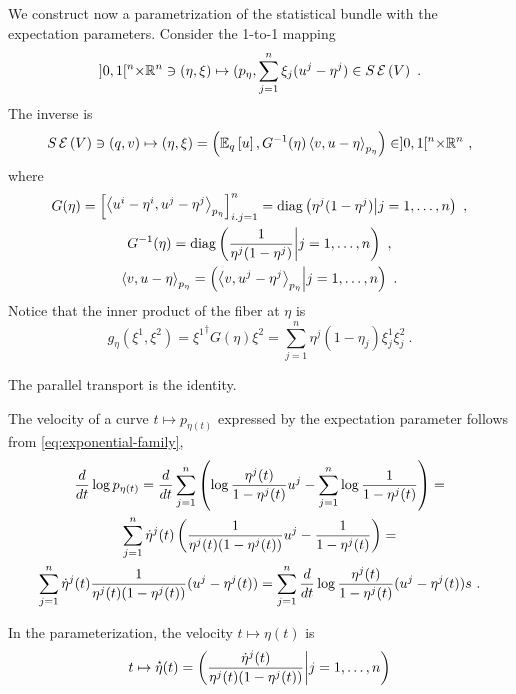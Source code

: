 \documentclass[12pt,a4paper]{amsart}
\newcommand{\transposed}{\dagger}
\theoremstyle{remark}
\begin{document}
We construct now a parametrization of the statistical bundle with the expectation parameters. Consider the 1-to-1 mapping
\begin{equation}
  \label{eq:67}
]0,1[^n \times \reals^n \ni (\eta,\xi) \mapsto (p_\eta,\sum_{j=1}^n \xi_j(u^j-\eta^j) \in \expbundleat V \ .
\end{equation}
The inverse is
\begin{equation}
  \label{eq:68}
  \expbundleat V \ni (q,v) \mapsto (\eta,\xi) = \left(\expectat q u,G^{-1}(\eta) \scalarat {p_\eta}{v}{u-\eta}\right) \in ]0,1[^n \times \reals^n \ ,
\end{equation}
where
\begin{gather}
  G(\eta) =
\begin{bmatrix}
  \scalarat {p_{\eta}} {u^i-\eta^i}{u^j-\eta^j}
\end{bmatrix}_{i.j=1}^n = \diagof{\eta^j(1-\eta^j) \middle| j = 1,\dots, n} \ , \\
G^{-1}(\eta)  = \diagof{\frac1{\eta^j(1-\eta^j)} \middle| j = 1,\dots, n} \ , \\
\scalarat {p_\eta}{v}{u-\eta} = \left(\scalarat {p_\eta}{v}{u^j-\eta^j} \middle| j=1,\dots,n \right) \ .
\end{gather}
Notice that the inner product of the fiber at $\eta$ is
\begin{equation}
  \label{eq:69}
  g_\eta(\xi^1,\xi^2) = {\xi^1}^\transposed G(\eta) \xi^2 = \sum_{j=1}^n \eta^j(1-\eta_j) \xi^1_j \xi^2_j \ .
\end{equation}

The parallel transport is the identity. 

The velocity of a curve $t \mapsto p_{\eta(t)}$ expressed by the expectation parameter follows from \cref{eq:exponential-family},
\begin{multline}
  \label{eq:32}
 \derivby t \log p_{\eta(t)} =  \derivby t \sum_{j=1}^n \left(\log \frac{\eta^j(t)}{1-\eta^j(t)} u^j - \sum_{j=1}^n \log \frac 1 {1 - \eta^j(t)}\right) = \\
  \sum_{j=1}^n \dot \eta^j(t) \left(\frac 1 {\eta^j(t)(1 - \eta^j(t))}u^j - \frac 1 {1 - \eta^j(t)}\right) = \\
    \sum_{j=1}^n \dot \eta^j(t) \frac{1}{\eta^j(t)(1 - \eta^j(t))} (u^j - \eta^j(t)) = \sum_{j=1}^n \derivby t \log \frac {\eta^j(t)}{1 - \eta^j(t)} (u^j - \eta^j(t))s \ .
\end{multline}

In the parameterization, the velocity $t \mapsto \eta(t)$ is
\begin{equation}
  \label{eq:70}
  t \mapsto \velocity \eta(t) = \left( \frac{\dot\eta^j(t)}{\eta^j(t)(1-\eta^j(t))} \middle| j = 1,\dots,n \right) 
\end{equation}
\end{document}
